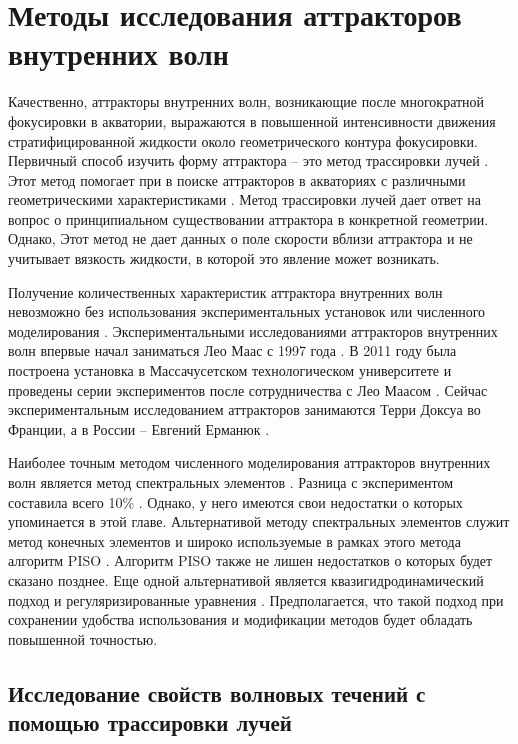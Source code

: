 \chapter{Методы исследования аттракторов внутренних волн}

Качественно, аттракторы внутренних волн, возникающие после многократной фокусировки в акватории, выражаются в повышенной интенсивности движения стратифицированной жидкости около геометрического контура фокусировки. Первичный способ изучить форму аттрактора -- это метод трассировки лучей \cite{Maas1997}. Этот метод помогает при в поиске аттракторов в акваториях с различными геометрическими характеристиками \cite{Guo2015}. Метод трассировки лучей дает ответ на вопрос о принципиальном существовании аттрактора в конкретной геометрии. Однако, Этот метод не дает данных о поле скорости вблизи аттрактора и не учитывает вязкость жидкости, в которой это явление может возникать.

Получение количественных характеристик аттрактора внутренних волн невозможно без использования экспериментальных установок или численного моделирования \cite{Brouzet2016}. Экспериментальными исследованиями аттракторов внутренних волн впервые начал заниматься Лео Маас с 1997 года \cite{Maas1997}. В 2011 году была построена установка в Массачусетском технологическом университете и проведены серии экспериментов \cite{Hazewinkel2011} после сотрудничества с Лео Маасом \cite{Hazewinkel2010}. Сейчас экспериментальным исследованием аттракторов занимаются Терри Доксуа \cite{Dauxoisetal2018} во Франции, а в России -- Евгений Ерманюк \cite{brouzet1997laboratory}.

Наиболее точным методом численного моделирования аттракторов внутренних волн является метод спектральных элементов \cite{NEK5000}. Разница с экспериментом составила всего 10\% \cite{Brouzet2014}. Однако, у него имеются свои недостатки о которых упоминается в этой главе. Альтернативой методу спектральных элементов служит метод конечных элементов \cite{ferziger2002computational} и широко используемые в рамках этого метода алгоритм PISO \cite{Issa1986-PISO}. Алгоритм PISO также не лишен недостатков о которых будет сказано позднее. Еще одной альтернативой является квазигидродинамический подход и регуляризированные уравнения \cite{ElizarBook}. Предполагается, что такой подход при сохранении удобства использования и модификации методов будет обладать повышенной точностью. 

\section{Исследование свойств волновых течений с помощью трассировки лучей}

